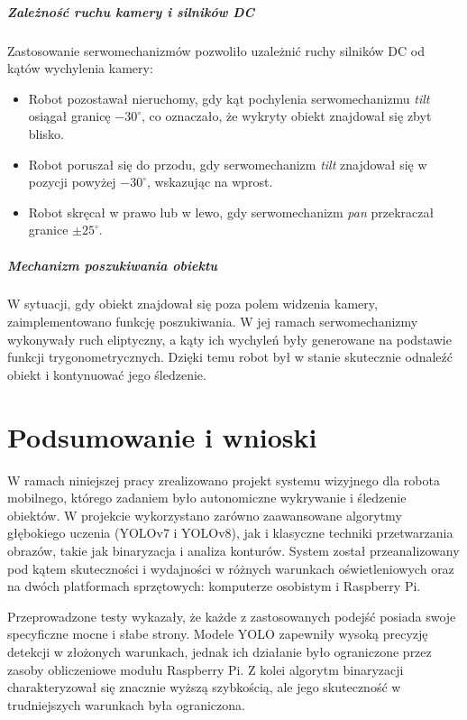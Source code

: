 \documentclass[a4paper,twoside,12pt]{book}
\begin{document}
\paragraph{Zależność ruchu kamery i silników DC}
Zastosowanie serwomechanizmów pozwoliło uzależnić ruchy silników DC od kątów wychylenia kamery:
\begin{itemize}
    \item Robot pozostawał nieruchomy, gdy kąt pochylenia serwomechanizmu \textit{tilt} osiągał granicę \(-30^\circ\), co oznaczało, że wykryty obiekt znajdował się zbyt blisko.
    \item Robot poruszał się do przodu, gdy serwomechanizm \textit{tilt} znajdował się w pozycji powyżej \(-30^\circ\), wskazując na wprost.
    \item Robot skręcał w prawo lub w lewo, gdy serwomechanizm \textit{pan} przekraczał granice \(\pm 25^\circ\).
\end{itemize}

\paragraph{Mechanizm poszukiwania obiektu}
W sytuacji, gdy obiekt znajdował się poza polem widzenia kamery, zaimplementowano funkcję poszukiwania. W jej ramach serwomechanizmy wykonywały ruch eliptyczny, a kąty ich wychyleń były generowane na podstawie funkcji trygonometrycznych. Dzięki temu robot był w stanie skutecznie odnaleźć obiekt i kontynuować jego śledzenie.

\chapter{Podsumowanie i wnioski}
\label{ch:07}

W ramach niniejszej pracy zrealizowano projekt systemu wizyjnego dla robota mobilnego, którego zadaniem było autonomiczne wykrywanie i śledzenie obiektów. W projekcie wykorzystano zarówno zaawansowane algorytmy głębokiego uczenia (YOLOv7 i YOLOv8), jak i klasyczne techniki przetwarzania obrazów, takie jak binaryzacja i analiza konturów. System został przeanalizowany pod kątem skuteczności i wydajności w różnych warunkach oświetleniowych oraz na dwóch platformach sprzętowych: komputerze osobistym i Raspberry Pi.

Przeprowadzone testy wykazały, że każde z zastosowanych podejść posiada swoje specyficzne mocne i słabe strony. Modele YOLO zapewniły wysoką precyzję detekcji w złożonych warunkach, jednak ich działanie było ograniczone przez zasoby obliczeniowe modułu Raspberry Pi. Z kolei algorytm binaryzacji charakteryzował się znacznie wyższą szybkością, ale jego skuteczność w trudniejszych warunkach była ograniczona.
\end{document}
